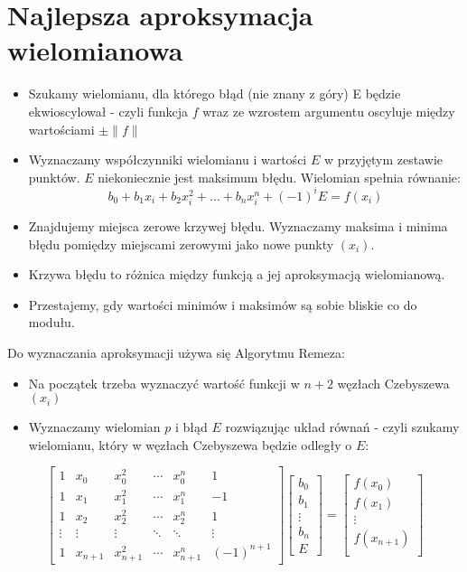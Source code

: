 \documentclass[a4paper]{article}
\begin{document}
\section{Najlepsza aproksymacja wielomianowa}
\begin{itemize}
    \item Szukamy wielomianu, dla którego błąd (nie znany z góry) E będzie ekwioscylował - czyli funkcja $f$ wraz ze wzrostem argumentu oscyluje między wartościami $\pm \|f\|$
    \item Wyznaczamy współczynniki wielomianu i wartości $E$ w przyjętym zestawie punktów. $E$ niekoniecznie jest maksimum błędu. Wielomian spełnia równanie:
    \begin{equation*}
        b_0+b_1x_i+b_2x_i^2+\ldots+b_nx_i^n+\left(-1\right)^iE=f\left(x_i\right)
    \end{equation*}
    \item Znajdujemy miejsca zerowe krzywej błędu. Wyznaczamy maksima i minima błędu pomiędzy miejscami zerowymi jako nowe punkty $(x_i)$.
    \item Krzywa błędu to różnica między funkcją a jej aproksymacją wielomianową.
    \item Przestajemy, gdy wartości minimów i maksimów są sobie bliskie co do modułu.
\end{itemize}

Do wyznaczania aproksymacji używa się Algorytmu Remeza:
\begin{itemize}
    \item Na początek trzeba wyznaczyć wartość funkcji w $n + 2$ węzłach Czebyszewa $(x_i)$
    \item Wyznaczamy wielomian $p$ i błąd $E$ rozwiązując układ równań - czyli szukamy wielomianu, który w węzłach Czebyszewa będzie odległy o $E$:
\end{itemize}
\begin{equation*}
        \begin{bmatrix}
            1 & x_0 & x_0^2 & \cdots & x_0^n & 1 \\
            1 & x_1 & x_1^2 & \cdots & x_1^n & -1\\
            1 & x_2 & x_2^2 & \cdots & x_2^n & 1 \\
            \vdots & \vdots & \vdots & \ddots & \ddots & \vdots \\
            1 & x_{n+1} & x_{n+1}^2 & \cdots & x_{n+1}^n & (-1)^{n+1}
        \end{bmatrix}
        \begin{bmatrix}
            b_0 \\
            b_1 \\
            \vdots \\
            b_n \\
            E
        \end{bmatrix}
        =
        \begin{bmatrix}
            f(x_0) \\
            f(x_1) \\
            \vdots \\
            f(x_{n+1}) \\
        \end{bmatrix}
    \end{equation*}
\end{document}
